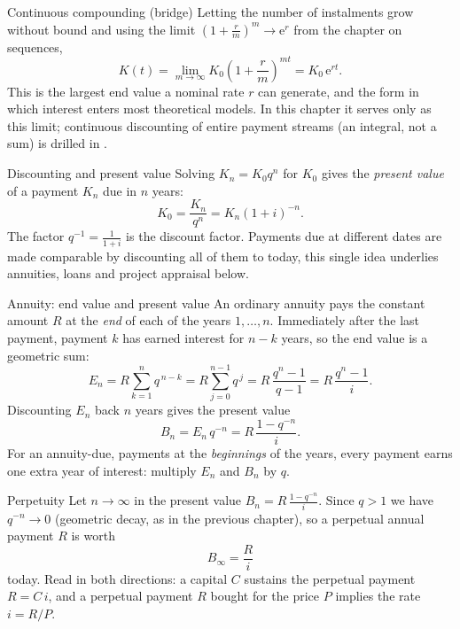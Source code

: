 \begin{rulebox}{Continuous compounding (bridge)}
Letting the number of instalments grow without bound and using the limit
$\left(1+\frac{r}{m}\right)^{m}\to\mathrm{e}^{r}$ from the chapter on
sequences,
\[
  K(t)=\lim_{m\to\infty}K_{0}\left(1+\frac{r}{m}\right)^{mt}
      =K_{0}\,\mathrm{e}^{rt} .
\]
This is the largest end value a nominal rate $r$ can generate, and the
form in which interest enters most theoretical models. In this chapter it
serves only as this limit; continuous discounting of entire payment
streams (an integral, not a sum) is drilled in .
\end{rulebox}

\begin{rulebox}{Discounting and present value}
Solving $K_{n}=K_{0}q^{n}$ for $K_{0}$ gives the \emph{present value} of a payment $K_{n}$ due in $n$ years:
\[
  K_{0}=\frac{K_{n}}{q^{n}}=K_{n}(1+i)^{-n} .
\]
The factor $q^{-1}=\frac{1}{1+i}$ is the discount factor. Payments due at different dates are made
comparable by discounting all of them to today, this single idea
underlies annuities, loans and project appraisal below.
\end{rulebox}

\begin{rulebox}{Annuity: end value and present value}
An ordinary annuity pays the constant amount
$R$ at the \emph{end} of each of the years $1,\dots,n$. Immediately after
the last payment, payment $k$ has earned interest for $n-k$ years, so the
end value is a geometric sum:
\[
  E_{n}=R\sum_{k=1}^{n}q^{\,n-k}=R\sum_{j=0}^{n-1}q^{\,j}
       =R\,\frac{q^{n}-1}{q-1}=R\,\frac{q^{n}-1}{i} .
\]
Discounting $E_{n}$ back $n$ years gives the present value
\[
  B_{n}=E_{n}\,q^{-n}=R\,\frac{1-q^{-n}}{i} .
\]
For an annuity-due, payments at the
\emph{beginnings} of the years, every payment earns one extra year of
interest: multiply $E_{n}$ and $B_{n}$ by $q$.
\end{rulebox}

\begin{rulebox}{Perpetuity}
Let $n\to\infty$ in the present value $B_{n}=R\,\frac{1-q^{-n}}{i}$.
Since $q>1$ we have $q^{-n}\to 0$ (geometric decay, as in the previous
chapter), so a perpetual annual payment $R$ is worth
\[
  B_{\infty}=\frac{R}{i}
\]
today. Read in both directions: a capital $C$ sustains the perpetual
payment $R=C\,i$, and a perpetual payment $R$ bought for the price $P$
implies the rate $i=R/P$.
\end{rulebox}

